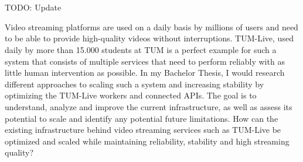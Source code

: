 \chapter{\abstractname}

TODO: Update

Video streaming platforms are used on a daily basis by millions of users and need to be able to provide high-quality videos without interruptions. TUM-Live, used daily by more than 15.000 students at TUM is a perfect example for such a system that consists of multiple services that need to perform reliably with as little human intervention as possible.
In my Bachelor Thesis, I would research different approaches to scaling such a system and increasing stability by optimizing the TUM-Live workers and connected APIs. The goal is to understand, analyze and improve the current infrastructure, as well as assess its potential to scale and identify any potential future limitations.
How can the existing infrastructure behind video streaming services such as TUM-Live be optimized and scaled while maintaining reliability, stability and high streaming quality?
